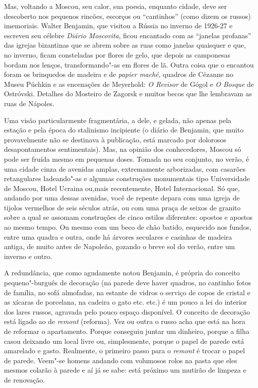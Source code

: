 Mas, voltando a Moscou, seu calor, sua poesia, enquanto cidade, deve ser
descoberto nos pequenos rincões, escorços ou ``cantinhos'' (como dizem
os russos) imemoriais. Walter Benjamin, que visitou a Rússia no inverno
de 1926-27 e escreveu seu célebre \emph{Diário Moscovita}, ficou
encantado com as ``janelas profanas'' das igrejas bizantinas que se
abrem sobre as ruas como janelas quaisquer e que, no inverno, ficam
consteladas por flores de gelo, que depois as camponesas bordam nos
lenços, transformando"-as em flores de lã. Outra coisa que o encantou
foram os brinquedos de madeira e de \emph{papier maché}, quadros de
Cézanne no Museu Púchkin e as encenações de Meyerhold: \emph{O Revisor}
de Gógol e \emph{O Bosque} de Ostróvski. Detalhes do Mosteiro de Zagorsk
e muitos becos que lhe lembravam as ruas de Nápoles.

Uma visão particularmente fragmentária, a dele, e gelada, não apenas
pela estação e pela época do stalinismo incipiente (o diário de
Benjamin, que muito provavelmente não se destinava à publicação, está
marcado por dolorosos desapontamentos sentimentais). Mas, na opinião dos
conhecedores, Moscou só pode ser fruída mesmo em pequenas doses. Tomada
no seu conjunto, no verão, é uma cidade cinza de avenidas amplas,
extremamente arborizadas, com casarões retangulares ladeando"-as e
algumas construções monumentais tipo Universidade de Moscou, Hotel
Ucraina ou,mais recentemente, Hotel Internacional. Só que, andando por
uma dessas avenidas, você de repente depara com uma igreja de tijolos
vermelhos de seis séculos atrás, ou com uma praça de seixos de granito
sobre a qual se assomam construções de cinco estilos diferentes: opostos
e apostos ao mesmo tempo. Ou mesmo com um beco de chão batido, esquecido
nos fundos, entre uma quadra e outra, onde há árvores seculares e
casinhas de madeira antiga, de muito antes de Napoleão, gozando o breve
sol do verão, entre um inverno e outro.

A redundância, que como agudamente notou Benjamin, é própria do conceito
pequeno"-burguês de decoração (na parede deve haver quadros, no cantinho
fotos de família, no sofá almofadas, na estante de vidros o serviço de
copos de cristal e as xícaras de porcelana, na cadeira o gato etc. etc.)
é um pouco a lei do interior dos lares russos, agravada pelo pouco
espaço disponível. O conceito de decoração está ligado ao de
\emph{remont} (reforma). Vez ou outra o russo acha que está na hora de
reformar o apartamento. Porque conseguiu juntar um dinheiro, porque a
filha casou deixando um local livre ou, simplesmente, porque o papel de
parede está amarelado e gasto. Realmente, o primeiro passo para o
\emph{remont} é trocar o papel de parede. Veem"-se homens andando com
volumosos rolos na pasta que eles mesmos colarão à parede e aí já se
sabe: está próximo um mutirão de limpeza e de renovação.

